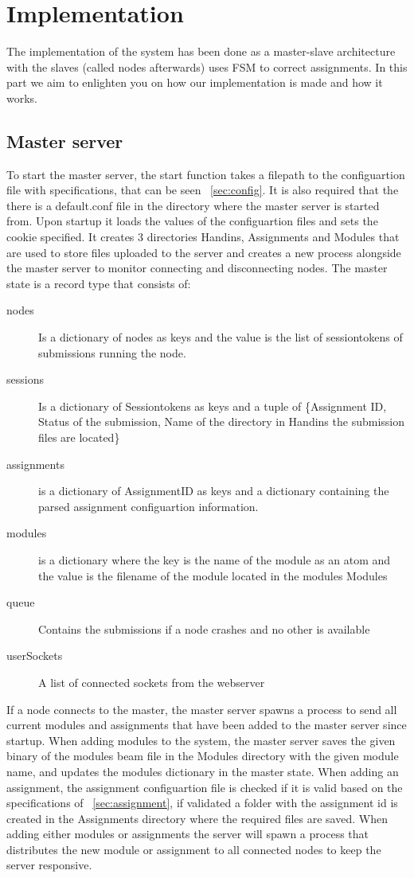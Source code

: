 \chapter{Implementation}
The implementation of the system has been done as a master-slave architecture
with the slaves (called nodes afterwards) uses FSM to correct assignments.
In this part we aim to enlighten you on how our implementation is made and how
it works.

\section{Master server}
To start the master server, the start function takes a filepath to the configuartion file with specifications, that can be seen ~\ref{sec:config}. It is also required that the there is a default.conf file in the directory where the master server is started from. Upon startup it loads the values of the configuartion files and sets the cookie specified. It creates 3 directories Handins, Assignments and Modules that are used to store files uploaded to the server and creates a new process alongside the master server to monitor connecting and disconnecting nodes. The master state is a record type that consists of:
\begin{description}
    \item[nodes] Is a dictionary of nodes as keys and the value is the list of sessiontokens of submissions running the node.
\item [sessions] Is a dictionary of Sessiontokens as keys and a tuple of \{Assignment ID, Status of the submission, Name of the directory in Handins the submission files are located\}
\item [assignments]  is a dictionary of AssignmentID as keys and a dictionary containing the parsed assignment configuartion information.
\item [modules]  is a dictionary where the key is the name of the module as an atom and the value is the filename of the module located in the modules Modules
\item [queue] Contains the submissions if a node crashes and no other is available
\item [userSockets] A list of connected sockets from the webserver
\end{description}
If a node connects to the master, the master server spawns a process to send all current modules and assignments that have been added to the master server since startup. When adding modules to the system, the master server saves the given binary of the modules beam file in the Modules directory with the given module name, and updates the modules dictionary in the master state. When adding an assignment, the assignment configuartion file is checked if it is valid based on the specifications of ~\ref{sec:assignment}, if validated a folder with the assignment id is created in the Assignments directory where the required files are saved. When adding either modules or assignments the server will spawn a process that distributes the new module or assignment to all connected nodes to keep the server responsive.


